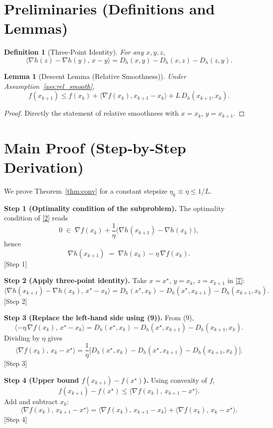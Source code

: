 \documentclass{article}
\newtheorem{lemma}{Lemma}
\newtheorem{definition}{Definition}
\begin{document}
\section*{Preliminaries (Definitions and Lemmas)}
\begin{definition}[Three‑Point Identity]
For any $x,y,z$,
\[
\langle\nabla h(z)-\nabla h(y),\,x-y\rangle
= D_{h}(x,y)-D_{h}(x,z)-D_{h}(z,y).
\tag{7}
\]
\end{definition}

\begin{lemma}[Descent Lemma (Relative Smoothness)]
Under Assumption~\ref{ass:rel_smooth},
\[
f(x_{k+1})\le f(x_k)+\langle\nabla f(x_k),x_{k+1}-x_k\rangle
+L\,D_h(x_{k+1},x_k).
\tag{8}
\]
\end{lemma}
\begin{proof}
Directly the statement of relative smoothness with $x=x_k$, $y=x_{k+1}$.
\end{proof}

\section*{Main Proof (Step‑by‑Step Derivation)}
We prove Theorem~\ref{thm:conv} for a constant stepsize
$\eta_k\equiv\eta\le 1/L$.

\noindent\textbf{Step 1 (Optimality condition of the subproblem).}
The optimality condition of \eqref{2} reads
\[
0\;\in\;\nabla f(x_k)+\frac{1}{\eta}\bigl(\nabla h(x_{k+1})-
\nabla h(x_k)\bigr),
\]
hence
\[
\nabla h(x_{k+1})\;=\;\nabla h(x_k)-\eta\,\nabla f(x_k).
\tag{9}
\]
[Step 1]

\noindent\textbf{Step 2 (Apply three‑point identity).}
Take $x=x^{\star}$, $y=x_k$, $z=x_{k+1}$ in \eqref{7}:
\[
\langle\nabla h(x_{k+1})-\nabla h(x_k),\,x^{\star}-x_k\rangle
= D_h(x^{\star},x_k)-D_h(x^{\star},x_{k+1})-D_h(x_{k+1},x_k).
\tag{10}
\]
[Step 2]

\noindent\textbf{Step 3 (Replace the left‑hand side using (9)).}
From (9),
\[
\langle -\eta\,\nabla f(x_k),\,x^{\star}-x_k\rangle
= D_h(x^{\star},x_k)-D_h(x^{\star},x_{k+1})-D_h(x_{k+1},x_k).
\tag{11}
\]
Dividing by $\eta$ gives
\[
\langle \nabla f(x_k),\,x_k-x^{\star}\rangle
= \frac{1}{\eta}\bigl[D_h(x^{\star},x_k)-D_h(x^{\star},x_{k+1})
-D_h(x_{k+1},x_k)\bigr].
\tag{12}
\]
[Step 3]

\noindent\textbf{Step 4 (Upper bound $f(x_{k+1})-f(x^{\star})$).}
Using convexity of $f$,
\[
f(x_{k+1})-f(x^{\star})\le
\langle \nabla f(x_k),\,x_{k+1}-x^{\star}\rangle .
\tag{13}
\]
Add and subtract $x_k$:
\[
\langle \nabla f(x_k),\,x_{k+1}-x^{\star}\rangle
= \langle \nabla f(x_k),\,x_{k+1}-x_k\rangle
+ \langle \nabla f(x_k),\,x_k-x^{\star}\rangle .
\tag{14}
\]
[Step 4]
\end{document}
